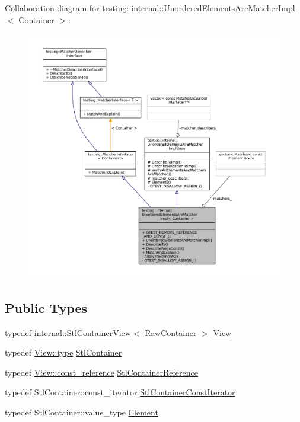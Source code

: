 Collaboration diagram for testing\+:\+:internal\+:\+:Unordered\+Elements\+Are\+Matcher\+Impl$<$ Container $>$\+:
\nopagebreak
\begin{figure}[H]
\begin{center}
\leavevmode
\includegraphics[width=350pt]{classtesting_1_1internal_1_1UnorderedElementsAreMatcherImpl__coll__graph}
\end{center}
\end{figure}
\subsection*{Public Types}
\begin{DoxyCompactItemize}
\item 
typedef \hyperlink{classtesting_1_1internal_1_1StlContainerView}{internal\+::\+Stl\+Container\+View}$<$ Raw\+Container $>$ \hyperlink{classtesting_1_1internal_1_1UnorderedElementsAreMatcherImpl_adbd6dfef7713dd30d569b4220eb808d3}{View}
\item 
typedef \hyperlink{classtesting_1_1internal_1_1StlContainerView_a2b2c63a6dcdbfe63fb0ee121ebf463ba}{View\+::type} \hyperlink{classtesting_1_1internal_1_1UnorderedElementsAreMatcherImpl_a6c23354dfe53bb47fa3d38d2869e273c}{Stl\+Container}
\item 
typedef \hyperlink{classtesting_1_1internal_1_1StlContainerView_a9cd4f6ed689b3938cdb7b3c4cbf1b36b}{View\+::const\+\_\+reference} \hyperlink{classtesting_1_1internal_1_1UnorderedElementsAreMatcherImpl_acf64d0e328361d4796bcf1aeb91ed975}{Stl\+Container\+Reference}
\item 
typedef Stl\+Container\+::const\+\_\+iterator \hyperlink{classtesting_1_1internal_1_1UnorderedElementsAreMatcherImpl_a656c30399e17043db476b639dcd4e6fa}{Stl\+Container\+Const\+Iterator}
\item 
typedef Stl\+Container\+::value\+\_\+type \hyperlink{classtesting_1_1internal_1_1UnorderedElementsAreMatcherImpl_ad62ba6ff582afe086d522951f94e30d0}{Element}
\end{DoxyCompactItemize}
